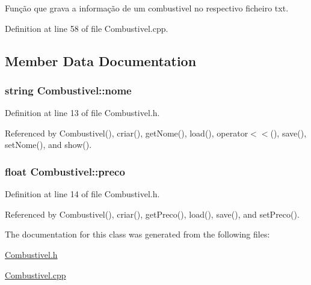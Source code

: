 Função que grava a informação de um combustivel no respectivo ficheiro txt. 



Definition at line 58 of file Combustivel.\+cpp.



\subsection{Member Data Documentation}
\hypertarget{class_combustivel_adfa329c4c4b60abcb87c1f3c82be4145}{
\subsubsection[{nome}]{\setlength{\rightskip}{0pt plus 5cm}string Combustivel\+::nome\hspace{0.3cm}{\ttfamily [private]}}}\label{class_combustivel_adfa329c4c4b60abcb87c1f3c82be4145}


Definition at line 13 of file Combustivel.\+h.



Referenced by Combustivel(), criar(), get\+Nome(), load(), operator$<$$<$(), save(), set\+Nome(), and show().

\hypertarget{class_combustivel_ac910a8410930ba553861f584da9f48d1}{
\subsubsection[{preco}]{\setlength{\rightskip}{0pt plus 5cm}float Combustivel\+::preco\hspace{0.3cm}{\ttfamily [private]}}}\label{class_combustivel_ac910a8410930ba553861f584da9f48d1}


Definition at line 14 of file Combustivel.\+h.



Referenced by Combustivel(), criar(), get\+Preco(), load(), save(), and set\+Preco().



The documentation for this class was generated from the following files\+:\begin{DoxyCompactItemize}
\item 
\hyperlink{_combustivel_8h}{Combustivel.\+h}\item 
\hyperlink{_combustivel_8cpp}{Combustivel.\+cpp}\end{DoxyCompactItemize}
